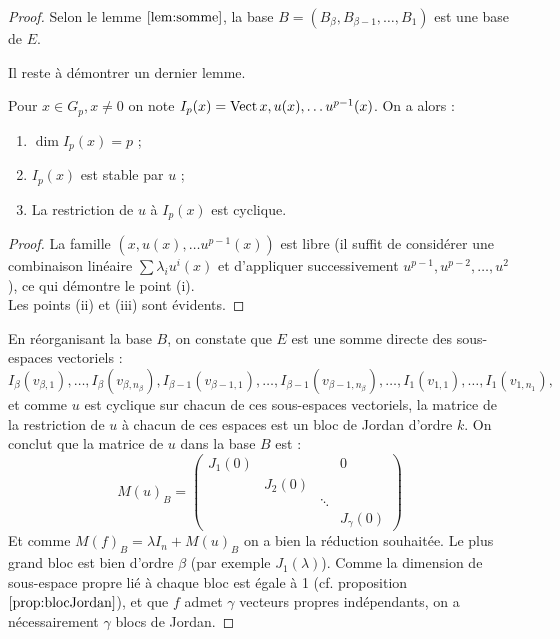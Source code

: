 \documentclass{article}
\begin{document}
\begin{proof}
Selon le lemme $\ref{lem:somme}$, la base $B=(B_{\beta}, B_{\beta-1}, \dots, B_1)$ est une base de $E$.  

Il reste à démontrer un dernier lemme.

\begin{lem}
Pour $x \in G_p, x \neq 0$ on note $I_p(x) = \operatorname{Vect}{x, u(x), \dots u^{p-1}(x)}$. On a alors :
\begin{enumerate}[label=(\roman*)]
\item $\dim{I_p(x)} = p$ ;
\item $I_p(x)$ est stable par $u$ ;
\item La restriction de $u$ à $I_p(x)$ est cyclique.
\end{enumerate}
\end{lem}

\begin{proof}
La famille $(x, u(x), \dots u^{p-1}(x))$ est libre (il suffit de considérer une combinaison linéaire $\sum \lambda_i u^i (x)$ et d'appliquer
successivement $u^{p-1}, u^{p-2}, \dots, u^2$), ce qui démontre le point (i). \\
Les points (ii) et (iii) sont évidents.
\end{proof}

En réorganisant la base $B$, on constate que $E$ est une somme directe des sous-espaces vectoriels :
\[ I_{\beta}(v_{\beta, 1}), \dots, I_{\beta}(v_{\beta, n_{\beta}}), I_{\beta-1}(v_{\beta-1, 1}), \dots, I_{\beta-1}(v_{\beta-1, n_{\beta}}), 
\dots, I_1(v_{1,1}), \dots, I_1(v_{1, n_1}), \]  
et comme $u$ est cyclique sur chacun de ces sous-espaces vectoriels, la matrice de la restriction de $u$ à chacun de ces espaces
est un bloc de Jordan d'ordre $k$.
On conclut que la matrice de $u$ dans la base $B$ est :
\[ M(u)_B = \begin{pmatrix}
J_1(0) & & & 0 \\
 & J_2(0) & & \\
 & & \ddots & \\
 & & & J_{\gamma}(0)
\end{pmatrix} \] 
Et comme $M(f)_B = \lambda I_n + M(u)_B$ on a bien la réduction souhaitée.
Le plus grand bloc est bien d'ordre $\beta$ (par exemple $J_1(\lambda)$). 
Comme la dimension de sous-espace propre lié à chaque bloc est égale à 1 (cf. proposition $\ref{prop:blocJordan}$),
et que $f$ admet $\gamma$ vecteurs propres indépendants, on a nécessairement $\gamma$ blocs de Jordan.
\end{proof}
\end{document}
